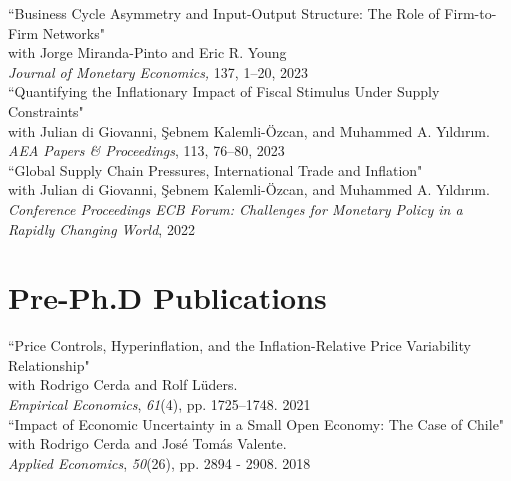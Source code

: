 \documentclass[10pt]{article}
\begin{document}
 ``Business Cycle Asymmetry and Input-Output Structure: The Role of Firm-to-Firm Networks"\\
 \indent with Jorge Miranda-Pinto and Eric R. Young\\
\indent \textit{Journal of Monetary Economics,} 137, 1--20, 2023\\[-0.125in]


\noindent ``Quantifying the Inflationary Impact of Fiscal Stimulus Under Supply Constraints"\\
\indent with Julian di Giovanni, \c{S}ebnem Kalemli-\"{O}zcan, and Muhammed A. Y{\i}ld{\i}r{\i}m. \\
\indent \textit{AEA Papers \& Proceedings}, 113, 76--80, 2023\\[-0.125in]

\noindent ``Global Supply Chain Pressures, International Trade and Inflation"\\
\indent with Julian di Giovanni, \c{S}ebnem Kalemli-\"{O}zcan, and Muhammed A. Y{\i}ld{\i}r{\i}m. \\
\indent \textit{Conference Proceedings ECB Forum: Challenges for Monetary Policy in a Rapidly Changing World}, 2022\\[-0.125in]

\section*{Pre-Ph.D Publications}
``Price Controls, Hyperinflation, and the Inflation-Relative Price Variability Relationship"\\
\indent with Rodrigo Cerda and Rolf L\"{u}ders. \\
\indent \textit{Empirical Economics}, \emph{61}(4), pp. 1725--1748. 2021\\[-0.125in]

\noindent ``Impact of Economic Uncertainty in a Small Open Economy: The Case of Chile"\\
\indent with Rodrigo Cerda and Jos\'e Tom\'as Valente. \\
\indent \textit{Applied Economics}, \textit{50}(26), pp. 2894 - 2908. 2018\\[-0.125in]

\end{document}
